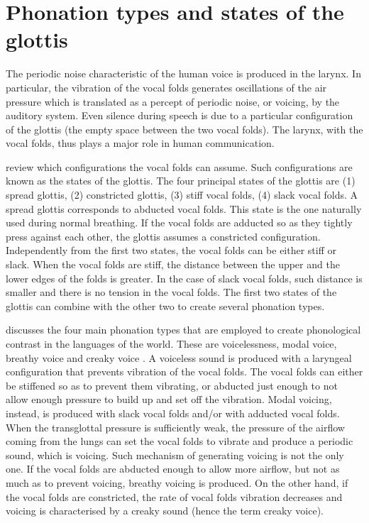 \documentclass[11pt,a4paper,openany]{memoir}\usepackage[]{graphicx}\usepackage[]{color}
\begin{document}
\section{Phonation types and states of the glottis}
\label{s:phonation}
The periodic noise characteristic of the human voice is produced in the larynx.
In particular, the vibration of the vocal folds generates oscillations of the air pressure which is translated as a percept of periodic noise, or voicing, by the auditory system.
Even silence during speech is due to a particular configuration of the glottis (the empty space between the two vocal folds).
The larynx, with the vocal folds, thus plays a major role in human communication.

\citet{halle2002} review which configurations the vocal folds can assume.
Such configurations are known as the states of the glottis.
The four principal states of the glottis are (1) spread glottis, (2) constricted glottis, (3) stiff vocal folds, (4) slack vocal folds.
A spread glottis corresponds to abducted vocal folds.
This state is the one naturally used during normal breathing.
If the vocal folds are adducted so as they tightly press against each other, the glottis assumes a constricted configuration.
Independently from the first two states, the vocal folds can be either stiff or slack.
When the vocal folds are stiff, the distance between the upper and the lower edges of the folds is greater.
In the case of slack vocal folds, such distance is smaller and there is no tension in the vocal folds.
The first two states of the glottis can combine with the other two to create several phonation types.

\citet{ladefoged1973} discusses the four main phonation types that are employed to create phonological contrast in the languages of the world.
These are voicelessness, modal voice, breathy voice and creaky voice \citep{halle2002}.
A voiceless sound is produced with a laryngeal configuration that prevents vibration of the vocal folds.
The vocal folds can either be stiffened so as to prevent them vibrating, or abducted just enough to not allow enough pressure to build up and set off the vibration.
Modal voicing, instead, is produced with slack vocal folds and/or with adducted vocal folds.
When the transglottal pressure is sufficiently weak, the pressure of the airflow coming from the lungs can set the vocal folds to vibrate and produce a periodic sound, which is voicing.
Such mechanism of generating voicing is not the only one.
If the vocal folds are abducted enough to allow more airflow, but not as much as to prevent voicing, breathy voicing is produced.
On the other hand, if the vocal folds are constricted, the rate of vocal folds vibration decreases and voicing is characterised by a creaky sound (hence the term creaky voice).
\end{document}
